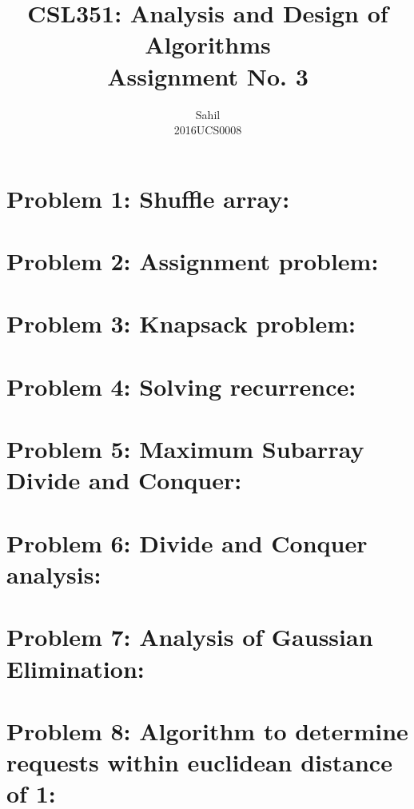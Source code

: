 \documentclass[12pt]{report}
\title{\centering CSL351: Analysis and Design of Algorithms \\Assignment No. 3}
\author{\LARGE Sahil\\2016UCS0008}
\begin{document}
\maketitle

\section{Problem 1: Shuffle array:}


\section{Problem 2: Assignment problem:}


\section{Problem 3: Knapsack problem:}


\section{Problem 4: Solving recurrence:}


\section{Problem 5: Maximum Subarray Divide and Conquer:}


\section{Problem 6: Divide and Conquer analysis:}


\section{Problem 7: Analysis of Gaussian Elimination:}


\section{Problem 8: Algorithm to determine requests within euclidean distance of 1:}


\end{document}
